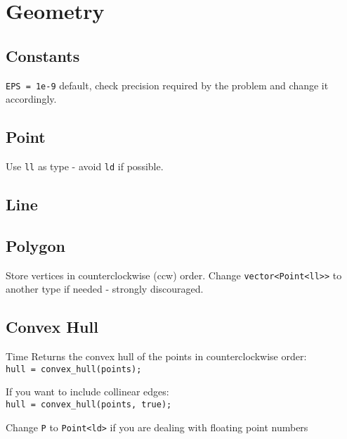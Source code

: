 \section{Geometry}

\subsection{Constants}
\verb|EPS = 1e-9| default, check precision required by the problem and
change it accordingly.



\subsection{Point}
Use \verb|ll| as type - avoid \verb|ld| if possible.


\subsection{Line}


\subsection{Polygon}
Store vertices in counterclockwise (ccw) order.
Change \verb|vector<Point<ll>>| to another type if needed - strongly discouraged.



\subsection{Convex Hull}
 Time
Returns the convex hull of the points in counterclockwise order: \\
\verb|hull = convex_hull(points);|

If you want to include collinear edges: \\
\verb|hull = convex_hull(points, true);|

Change \verb|P| to \verb|Point<ld>| if you are dealing with floating point numbers

